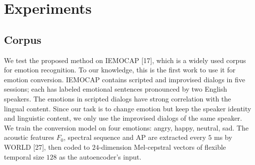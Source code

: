 \documentclass{article}
\begin{document}





\section{Experiments}
\label{sec:exp}

\subsection{Corpus}
We test the proposed method on IEMOCAP [17], which is a widely used corpus for emotion recognition. To our knowledge, this is the first work to use it for emotion conversion. IEMOCAP contains scripted and improvised
dialogs in five sessions; each has labeled emotional sentences pronounced by two English speakers. The emotions in scripted dialogs have strong correlation with the lingual content. Since our task is to change emotion but keep the speaker identity and linguistic content, we only use the improvised dialogs of the same speaker. We train the conversion model on four emotions: angry, happy, neutral, sad. The acoustic features $F_0$, spectral sequence and AP are extracted every $5$ ms by WORLD [27], then coded to $24$-dimension Mel-cepstral vectors of flexible temporal size $128$ as the autoencoder's input.

\end{document}
